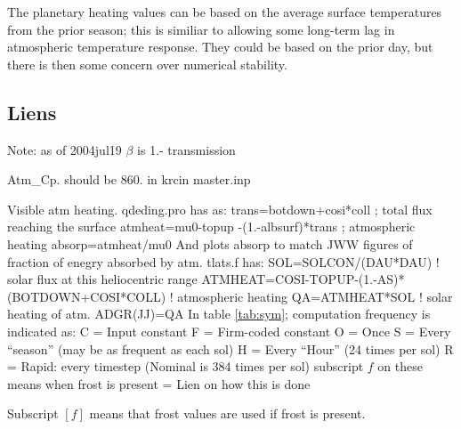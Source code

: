  
The planetary heating values can be based on the average surface temperatures
from the prior season; this is similiar to allowing some long-term lag in
atmospheric temperature response. They could be based on the prior day, but
there is then some concern over numerical stability.

\subsection{Liens}

Note: as of 2004jul19  $\beta$ is 1.- transmission

 Atm\_Cp.  should be 860. in krcin master.inp

Visible atm heating.  
\qi  qdeding.pro has as: 
\qiii    trans=botdown+cosi*coll     ; total flux reaching the surface
\qiii    atmheat=mu0-topup -(1.-albsurf)*trans ; atmospheric heating
\qiii    absorp=atmheat/mu0
\qii And plots absorp to match JWW figures of fraction of  enegry absorbed by atm.
\qi  tlats.f has:
\qiii   SOL=SOLCON/(DAU*DAU)    ! solar flux at this heliocentric range
\qiii       ATMHEAT=COSI-TOPUP-(1.-AS)*(BOTDOWN+COSI*COLL) ! atmospheric heating
\qiii     QA=ATMHEAT*SOL        ! solar heating of atm.
\qiii     ADGR(JJ)=QA
In table \ref{tab:sym}; computation frequency is indicated as:
\qii C = Input constant
\qii F = Firm-coded constant
\qii O = Once
\qii S = Every ``season'' (may be as frequent as each sol)
\qii H = Every ``Hour'' (24 times per sol)
\qii R = Rapid: every timestep (Nominal is 384 times per sol)
\qi subscript $f$ on these means when frost is present
\qii * = Lien on how this is done

Subscript $[f]$ means that frost values are used if frost is present.


